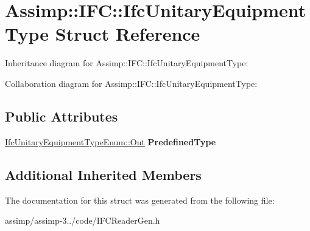 \hypertarget{struct_assimp_1_1_i_f_c_1_1_ifc_unitary_equipment_type}{\section{Assimp\+:\+:I\+F\+C\+:\+:Ifc\+Unitary\+Equipment\+Type Struct Reference}
\label{struct_assimp_1_1_i_f_c_1_1_ifc_unitary_equipment_type}
}


Inheritance diagram for Assimp\+:\+:I\+F\+C\+:\+:Ifc\+Unitary\+Equipment\+Type\+:


Collaboration diagram for Assimp\+:\+:I\+F\+C\+:\+:Ifc\+Unitary\+Equipment\+Type\+:
\subsection*{Public Attributes}
\begin{DoxyCompactItemize}
\item 
\hypertarget{struct_assimp_1_1_i_f_c_1_1_ifc_unitary_equipment_type_af3f7b46a2b459964b85f87af3031ebd6}{\hyperlink{classboost_1_1shared__ptr}{Ifc\+Unitary\+Equipment\+Type\+Enum\+::\+Out} {\bfseries Predefined\+Type}}\label{struct_assimp_1_1_i_f_c_1_1_ifc_unitary_equipment_type_af3f7b46a2b459964b85f87af3031ebd6}

\end{DoxyCompactItemize}
\subsection*{Additional Inherited Members}


The documentation for this struct was generated from the following file\+:\begin{DoxyCompactItemize}
\item 
assimp/assimp-\/3../code/I\+F\+C\+Reader\+Gen.\+h\end{DoxyCompactItemize}
